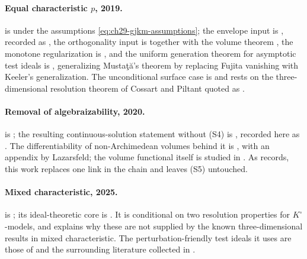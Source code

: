 \paragraph{Equal characteristic \(p\), 2019.}
 is
\cite[Theorem~1.5 and Theorem~9.3]{GJKM19} under the assumptions
\eqref{eq:ch29-gjkm-assumptions}; the envelope input is
\cite[Theorem~1.4 and Theorem~8.2]{GJKM19}, recorded as
, the orthogonality input is
\cite[Theorem~9.2]{GJKM19} together with the volume theorem
\cite[Theorem~6.3.2]{BGGJKM20}, the monotone regularization is
\cite[Corollary~9.1]{GJKM19}, and the uniform generation theorem for
asymptotic test ideals is
\cite[Theorem~1.3 and Theorem~4.6]{GJKM19}, generalizing
Mustaţă's theorem \cite{MustataTest} by replacing Fujita vanishing with
Keeler's generalization.  The unconditional surface case
 is \cite[Corollary~8.3]{GJKM19} and rests
on the three-dimensional resolution theorem of Cossart and Piltant quoted
as \cite[Theorem~6.3]{GJKM19}.

\paragraph{Removal of algebraizability, 2020.}
 is
\cite[Theorem~6.3.3 and Corollary~6.3.4]{BGGJKM20}; the resulting
continuous-solution statement without \textup{(S4)} is
\cite[Theorem~D]{BGGJKM20}, recorded here as
.  The differentiability of non-Archimedean volumes
behind it is \cite[Theorem~6.3.2]{BGGJKM20}, with an appendix by Lazarsfeld;
the volume functional itself is studied in \cite{BGM21}.  As
 records, this work replaces one link in
the chain and leaves \textup{(S5)} untouched.

\paragraph{Mixed characteristic, 2025.}
 is \cite[Theorems~7.1 and~8.1]{FGK25};
its ideal-theoretic core is \cite[Theorem~5.1]{FGK25}.  It is conditional on
two resolution properties for \(K^\circ\)-models, and
 explains why these are not supplied by the
known three-dimensional results in mixed characteristic.  The
perturbation-friendly test ideals it uses are those of
\cite{RobertsSingh} and the surrounding literature collected in
.

